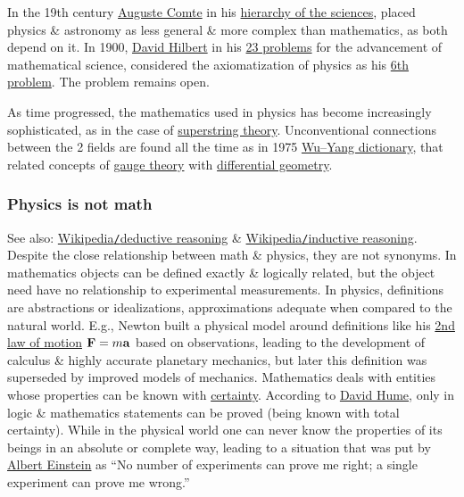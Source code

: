 \documentclass{article}
\begin{document}
In the 19th century \href{https://en.wikipedia.org/wiki/Auguste_Comte}{\sc Auguste Comte} in his \href{https://en.wikipedia.org/wiki/Hierarchy_of_the_sciences}{hierarchy of the sciences}, placed physics \& astronomy as less general \& more complex than mathematics, as both depend on it. In 1900, \href{https://en.wikipedia.org/wiki/David_Hilbert}{\sc David Hilbert} in his \href{https://en.wikipedia.org/wiki/Hilbert%27s_problems}{23 problems} for the advancement of mathematical science, considered the axiomatization of physics as his \href{https://en.wikipedia.org/wiki/Hilbert%27s_sixth_problem}{6th problem}. The problem remains open.

As time progressed, the mathematics used in physics has become increasingly sophisticated, as in the case of \href{https://en.wikipedia.org/wiki/Superstring_theory}{superstring theory}. Unconventional connections between the 2 fields are found all the time as in 1975 \href{https://en.wikipedia.org/wiki/Wu%E2%80%93Yang_dictionary}{Wu--Yang dictionary}, that related concepts of \href{https://en.wikipedia.org/wiki/Gauge_theory}{gauge theory} with \href{https://en.wikipedia.org/wiki/Differential_geometry}{differential geometry}.

\subsubsection{Physics is not math}
See also: \href{https://en.wikipedia.org/wiki/Deductive_reasoning}{Wikipedia{\tt/}deductive reasoning} \& \href{https://en.wikipedia.org/wiki/Inductive_reasoning}{Wikipedia{\tt/}inductive reasoning}. Despite the close relationship between math \& physics, they are not synonyms. In mathematics objects can be defined exactly \& logically related, but the object need have no relationship to experimental measurements. In physics, definitions are abstractions or idealizations, approximations adequate when compared to the natural world. E.g., {\sc Newton} built a physical model around definitions like his \href{https://en.wikipedia.org/wiki/Newton%27s_laws_of_motion}{2nd law of motion} ${\bf F} = m{\bf a}$ based on observations, leading to the development of calculus \& highly accurate planetary mechanics, but later this definition was superseded by improved models of mechanics. Mathematics deals with entities whose properties can be known with \href{https://en.wikipedia.org/wiki/Certainty}{certainty}. According to \href{https://en.wikipedia.org/wiki/David_Hume}{\sc David Hume}, only in logic \& mathematics statements can be proved (being known with total certainty). While in the physical world one can never know the properties of its beings in an absolute or complete way, leading to a situation that was put by \href{https://en.wikipedia.org/wiki/Albert_Einstein}{\sc Albert Einstein} as ``No number of experiments can prove me right; a single experiment can prove me wrong.''
\end{document}
